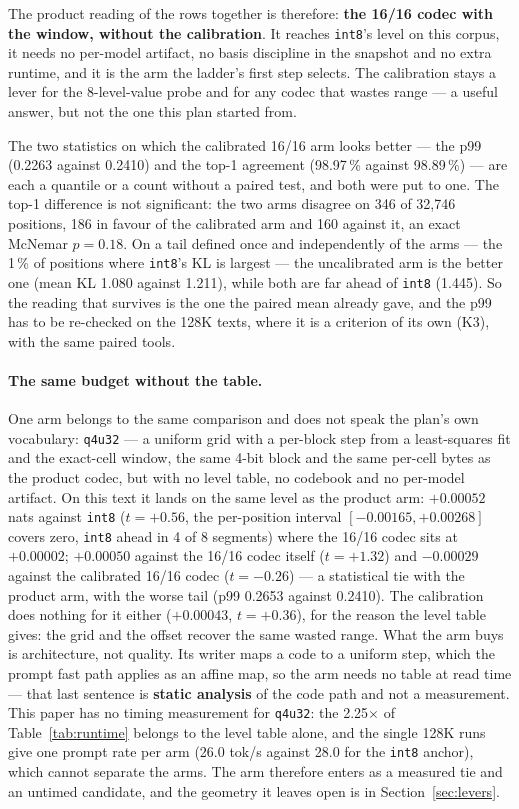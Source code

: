 \documentclass[10pt,twocolumn]{article}
\begin{document}
The product reading of the rows together is therefore: \textbf{the 16/16 codec with the window, without the calibration}. It reaches \texttt{int8}'s level on this corpus, it needs no per-model artifact, no basis discipline in the snapshot and no extra runtime, and it is the arm the ladder's first step selects. The calibration stays a lever for the 8-level-value probe and for any codec that wastes range --- a useful answer, but not the one this plan started from.

The two statistics on which the calibrated 16/16 arm looks better --- the p99 (0.2263 against 0.2410) and the top-1 agreement (98.97\,\% against 98.89\,\%) --- are each a quantile or a count without a paired test, and both were put to one. The top-1 difference is not significant: the two arms disagree on 346 of 32,746 positions, 186 in favour of the calibrated arm and 160 against it, an exact McNemar $p = 0.18$. On a tail defined once and independently of the arms --- the 1\,\% of positions where \texttt{int8}'s KL is largest --- the uncalibrated arm is the better one (mean KL 1.080 against 1.211), while both are far ahead of \texttt{int8} (1.445). So the reading that survives is the one the paired mean already gave, and the p99 has to be re-checked on the 128K texts, where it is a criterion of its own (K3), with the same paired tools.

\paragraph{The same budget without the table.} One arm belongs to the same comparison and does not speak the plan's own vocabulary: \texttt{q4u32} --- a uniform grid with a per-block step from a least-squares fit and the exact-cell window, the same 4-bit block and the same per-cell bytes as the product codec, but with no level table, no codebook and no per-model artifact. On this text it lands on the same level as the product arm: $+0.00052$ nats against \texttt{int8} ($t = +0.56$, the per-position interval $[-0.00165, +0.00268]$ covers zero, \texttt{int8} ahead in 4 of 8 segments) where the 16/16 codec sits at $+0.00002$; $+0.00050$ against the 16/16 codec itself ($t = +1.32$) and $-0.00029$ against the calibrated 16/16 codec ($t = -0.26$) --- a statistical tie with the product arm, with the worse tail (p99 0.2653 against 0.2410). The calibration does nothing for it either ($+0.00043$, $t = +0.36$), for the reason the level table gives: the grid and the offset recover the same wasted range. What the arm buys is architecture, not quality. Its writer maps a code to a uniform step, which the prompt fast path applies as an affine map, so the arm needs no table at read time --- that last sentence is \textbf{static analysis} of the code path and not a measurement. This paper has no timing measurement for \texttt{q4u32}: the 2.25$\times$ of Table~\ref{tab:runtime} belongs to the level table alone, and the single 128K runs give one prompt rate per arm (26.0 tok/s against 28.0 for the \texttt{int8} anchor), which cannot separate the arms. The arm therefore enters as a measured tie and an untimed candidate, and the geometry it leaves open is in Section~\ref{sec:levers}.
\end{document}
